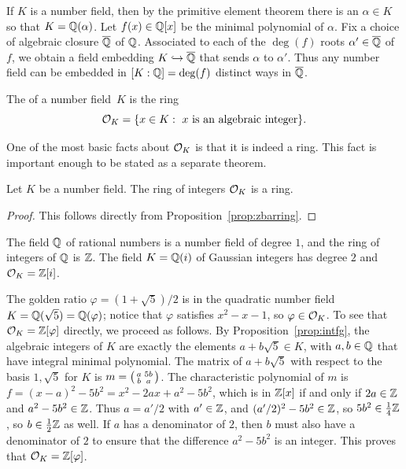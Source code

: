 If $K$ is a number field, then by the primitive element theorem there
is an $\alpha \in K$ so that $K = \mathbb{Q}(\alpha)$.  Let $f(x) \in \mathbb{Q}[x]$
be the minimal polynomial of $\alpha$.  Fix a choice of algebraic
closure $\overline{\mathbb{Q}}$ of $\mathbb{Q}$.  Associated to each of the $\deg(f)$ roots
$\alpha'\in\overline{\mathbb{Q}}$ of $f$, we obtain a field embedding $K\hookrightarrow \overline{\mathbb{Q}}$
that sends $\alpha$ to $\alpha'$.  Thus any number field can be
embedded in $[K:\mathbb{Q}]=\deg(f)$ distinct ways in $\overline{\mathbb{Q}}$.

\begin{definition}
	The  of a number field~$K$ is the ring
	$$
		\mathcal{O}_K = \{x \in K : \text{ $x$ is an algebraic integer}\}.
	$$
\end{definition}

One of the most basic facts about $\mathcal{O}_K$ is that it is indeed a ring.
This fact is important enough to be stated as a separate theorem.

\begin{theorem}
	Let $K$ be a number field.
	The ring of integers $\mathcal{O}_K$ is a ring.
\end{theorem}
\begin{proof}
	This follows directly from Proposition~\ref{prop:zbarring}.
\end{proof}


\begin{example}
	The field $\mathbb{Q}$ of rational numbers is a number field of degree $1$,
	and the ring of integers of $\mathbb{Q}$ is $\mathbb{Z}$.  The field $K=\mathbb{Q}(i)$ of
	Gaussian integers has degree $2$ and $\mathcal{O}_K = \mathbb{Z}[i]$.
\end{example}

\begin{example}\label{example:Qsqrt5ringofints}
	The golden ratio $\varphi =(1+\sqrt{5})/2$ is in the quadratic
	number field $K=\mathbb{Q}(\sqrt{5})=\mathbb{Q}(\varphi)$; notice that
	$\varphi$ satisfies $x^2-x-1$, so $\varphi\in\mathcal{O}_K$.
	To see that $\mathcal{O}_K = \mathbb{Z}[\varphi]$ directly, we proceed as follows.
	By Proposition~\ref{prop:intfg}, the algebraic integers of $K$
	are exactly the elements $a+b\sqrt{5} \in K$, with $a,b\in\mathbb{Q}$
	that have integral minimal polynomial. The matrix of $a+b\sqrt{5}$
	with respect to the basis $1,\sqrt{5}$ for $K$ is
	$m=\left( \begin{smallmatrix}a&5b\\b&a\end{smallmatrix}\right)$. The characteristic polynomial of $m$ is
	$f = (x-a)^2 - 5b^2 = x^2 - 2ax + a^2 - 5b^2$, which is in $\mathbb{Z}[x]$
	if and only if $2a\in\mathbb{Z}$ and $a^2-5b^2\in\mathbb{Z}$. Thus $a=a'/2$ with
	$a'\in\mathbb{Z}$, and $(a'/2)^2 - 5b^2 \in\mathbb{Z}$, so $5b^2 \in \frac{1}{4}\mathbb{Z}$,
	so $b\in\frac{1}{2}\mathbb{Z}$ as well. If $a$ has a denominator of $2$,
	then $b$ must also have a denominator of $2$ to ensure that the
	difference $a^2-5b^2$ is an integer. This proves that
	$\mathcal{O}_K = \mathbb{Z}[\varphi]$.
\end{example}

